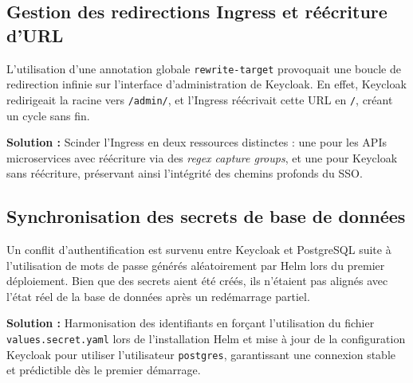 \documentclass[12pt,a4paper]{article}
\begin{document}
\subsection{Gestion des redirections Ingress et réécriture d'URL}
L'utilisation d'une annotation globale \texttt{rewrite-target} provoquait une boucle de redirection infinie sur l'interface d'administration de Keycloak. En effet, Keycloak redirigeait la racine vers \texttt{/admin/}, et l'Ingress réécrivait cette URL en \texttt{/}, créant un cycle sans fin.

\textbf{Solution :} Scinder l'Ingress en deux ressources distinctes : une pour les APIs microservices avec réécriture via des \textit{regex capture groups}, et une pour Keycloak sans réécriture, préservant ainsi l'intégrité des chemins profonds du SSO.

\subsection{Synchronisation des secrets de base de données}
Un conflit d'authentification est survenu entre Keycloak et PostgreSQL suite à l'utilisation de mots de passe générés aléatoirement par Helm lors du premier déploiement. Bien que des secrets aient été créés, ils n'étaient pas alignés avec l'état réel de la base de données après un redémarrage partiel.

\textbf{Solution :} Harmonisation des identifiants en forçant l'utilisation du fichier \texttt{values.secret.yaml} lors de l'installation Helm et mise à jour de la configuration Keycloak pour utiliser l'utilisateur \texttt{postgres}, garantissant une connexion stable et prédictible dès le premier démarrage.
\end{document}
